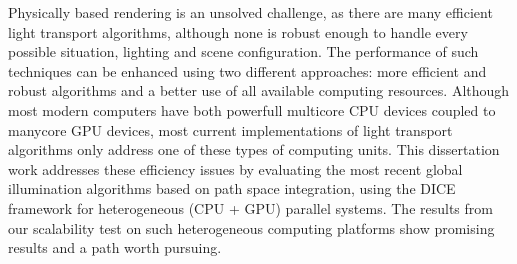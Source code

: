 Physically based rendering is an unsolved challenge, as there are many efficient light transport algorithms, although none is robust enough to handle every possible situation, lighting and scene configuration. The performance of such techniques can be enhanced using two different approaches: more efficient and robust algorithms and a better use of all available computing resources. Although most modern computers have both powerfull multicore CPU devices coupled to manycore GPU devices, most current implementations of light transport algorithms only address one of these types of computing units. This dissertation work addresses these efficiency issues by evaluating the most recent global illumination algorithms based on path space integration, using the DICE framework for heterogeneous (CPU + GPU) parallel systems. The results from our scalability test on such heterogeneous computing platforms show promising results and a path worth pursuing.
